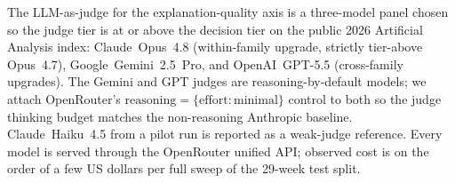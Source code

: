 The LLM-as-judge for the explanation-quality axis is a
three-model panel chosen so the judge tier is at or above the
decision tier on the public 2026 Artificial Analysis index:
Claude~Opus~4.8 (within-family upgrade, strictly tier-above
Opus~4.7),
Google~Gemini~2.5~Pro, and OpenAI~GPT-5.5 (cross-family
upgrades). The Gemini and GPT judges are reasoning-by-default
models; we attach OpenRouter's $\mathrm{reasoning}=
\{\mathrm{effort:minimal}\}$ control to both so the judge
thinking budget matches the non-reasoning Anthropic baseline.
Claude~Haiku~4.5 from a pilot run is reported as a weak-judge
reference. Every model is served through the OpenRouter unified
API; observed cost is on the order of a few US dollars per
full sweep of the 29-week test split.
